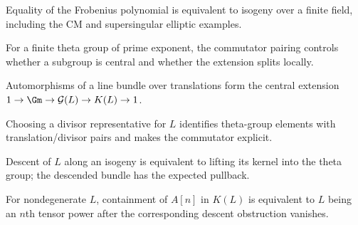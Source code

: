 \begin{theorem}
\label{mumford-iv22-cm-finite-field-isogeny}
Equality of the Frobenius polynomial is equivalent to isogeny over a finite
field, including the CM and supersingular elliptic examples.
\notready
\end{theorem}

\begin{lemma}
\label{mumford-iv23-theta-group-triviality}
For a finite theta group of prime exponent, the commutator pairing controls
whether a subgroup is central and whether the extension splits locally.
\notready
\end{lemma}

\begin{theorem}
\label{mumford-iv23-line-bundle-theta-group}
Automorphisms of a line bundle over translations form the central extension
$1\to\Gm\to\mathcal G(L)\to K(L)\to1$.
\notready
\end{theorem}

\begin{definition}
\label{mumford-iv23-divisor-description}
Choosing a divisor representative for $L$ identifies theta-group elements with
translation/divisor pairs and makes the commutator explicit.
\notready
\end{definition}

\begin{theorem}
\label{mumford-iv23-isogeny-lifting-theorem}
Descent of $L$ along an isogeny is equivalent to lifting its kernel into the
theta group; the descended bundle has the expected pullback.
\notready
\end{theorem}

\begin{theorem}
\label{mumford-iv23-power-criterion}
For nondegenerate $L$, containment of $A[n]$ in $K(L)$ is equivalent to $L$
being an $n$th tensor power after the corresponding descent obstruction
vanishes.
\notready
\end{theorem}

